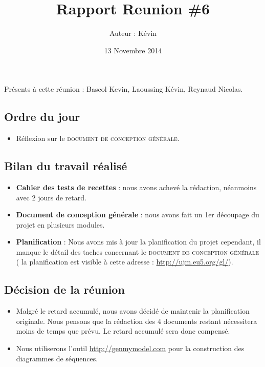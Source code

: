\documentclass[12pt,a4paper]{article}
\title{Rapport Reunion \#6}
\author{Auteur : Kévin \bsc{LAOUSSING}}
\date{13 Novembre 2014}
\begin{document}
\maketitle

\newpage

Présents à cette réunion : Bascol Kevin, Laoussing Kévin, Reynaud Nicolas.

\subsection*{Ordre du jour}
\begin{itemize}[label = $\blacktriangleright$]
\item Réflexion sur le \textsc{document de conception générale}.
\end{itemize}

\subsection*{Bilan du travail réalisé}

\begin{itemize}[label = $\blacktriangleright$]
\item \textbf{Cahier des tests de recettes} : nous avons achevé la rédaction, néanmoins avec 2 jours de retard.

\item \textbf{Document de conception générale} : nous avons fait un 1er découpage du projet en plusieurs modules.

\item \textbf{Planification} : Nous avons mis à jour la planification du projet cependant, il manque le détail des taches concernant le \textsc{document de conception générale} ( la planification est visible à cette adresse : \url{http://ujm.eu5.org/gl/}).\\

\end{itemize}


\subsection*{Décision de la réunion}

\begin{itemize}[label = $\blacktriangleright$]
\item Malgré le retard accumulé, nous avons décidé de maintenir la planification originale. Nous pensons que la rédaction des 4 documents restant nécessitera moins de temps que prévu. Le retard accumulé sera donc compensé.
\item Nous utiliserons l'outil \url{http://genmymodel.com} pour la construction des diagrammes de séquences.
\end{itemize}
\end{document}

